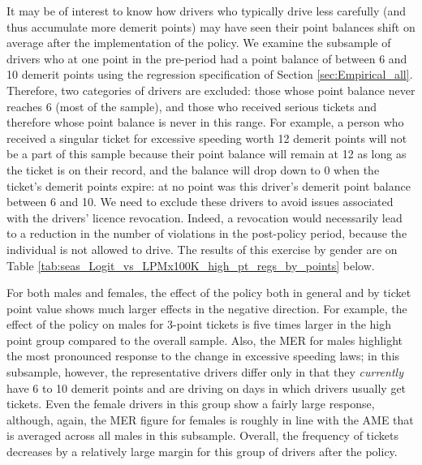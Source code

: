 It may be of interest to know how drivers who typically drive less carefully 
(and thus accumulate more demerit points) 
may have seen their point balances shift on average after the implementation of the policy. 
We examine the subsample of drivers who at one point in the pre-period 
had a point balance of between 6 and 10 demerit points 
using the regression specification of 
Section \ref{sec:Empirical_all}. 
Therefore, two categories of drivers are excluded: 
those whose point balance never reaches 6 (most of the sample), 
and those who received serious tickets and therefore whose point balance is never in this range. 
For example, a person who received a singular ticket for excessive speeding worth 12 demerit points 
will not be a part of this sample because their point balance will remain at 12 
as long as the ticket is on their record, 
and the balance will drop down to 0 when the ticket’s demerit points expire: 
at no point was this driver’s demerit point balance between 6 and 10. 
We need to exclude these drivers to avoid issues associated with the drivers’ licence revocation. 
Indeed, a revocation would necessarily lead to a reduction in the number of violations 
in the post-policy period, because the individual is not allowed to drive. 
The results of this exercise by gender are on 
Table \ref{tab:seas_Logit_vs_LPMx100K_high_pt_regs_by_points} below. 




For both males and females, 
the effect of the policy both in general and by ticket point value 
shows much larger effects in the negative direction. 
For example, the effect of the policy on males for 3-point tickets is five times larger 
in the high point group compared to the overall sample. 
% 
Also, the MER for males highlight the most pronounced response to the
change in excessive speeding laws; 
in this subsample, however, the representative drivers differ only 
in that they \emph{currently} have 6 to 10 demerit points 
and are driving on days in which drivers usually get tickets.  
% 
Even the female drivers in this group show a fairly large response, 
although, again, the MER figure for females is roughly in line with 
the AME that is averaged across all males in this subsample. 
% 
Overall, the frequency of tickets decreases by a relatively large margin 
for this group of drivers after the policy.




